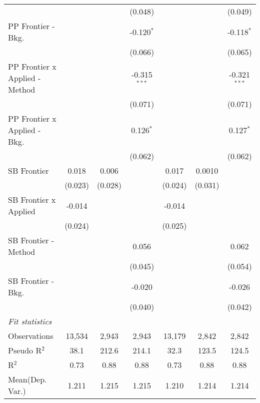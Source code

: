 \begin{tabular}{lcccccc}
                                  &                &                & (0.048)        &                &                & (0.049)\\   
   PP Frontier - Bkg.             &                &                & -0.120$^{*}$   &                &                & -0.118$^{*}$\\   
                                  &                &                & (0.066)        &                &                & (0.065)\\   
   PP Frontier x Applied - Method &                &                & -0.315$^{***}$ &                &                & -0.321$^{***}$\\   
                                  &                &                & (0.071)        &                &                & (0.071)\\   
   PP Frontier x Applied - Bkg.   &                &                & 0.126$^{*}$    &                &                & 0.127$^{*}$\\   
                                  &                &                & (0.062)        &                &                & (0.062)\\   
   SB Frontier                    & 0.018          & 0.006          &                & 0.017          & 0.0010         &   \\   
                                  & (0.023)        & (0.028)        &                & (0.024)        & (0.031)        &   \\   
   SB Frontier x Applied          & -0.014         &                &                & -0.014         &                &   \\   
                                  & (0.024)        &                &                & (0.025)        &                &   \\   
   SB Frontier - Method           &                &                & 0.056          &                &                & 0.062\\   
                                  &                &                & (0.045)        &                &                & (0.054)\\   
   SB Frontier - Bkg.             &                &                & -0.020         &                &                & -0.026\\   
                                  &                &                & (0.040)        &                &                & (0.042)\\   
   \midrule
   \emph{Fit statistics}\\
   Observations                   & 13,534         & 2,943          & 2,943          & 13,179         & 2,842          & 2,842\\  
   Pseudo R$^2$                   & 38.1           & 212.6          & 214.1          & 32.3           & 123.5          & 124.5\\  
   R$^2$                          & 0.73           & 0.88           & 0.88           & 0.73           & 0.88           & 0.88\\  
Mean(Dep. Var.) & 1.211 & 1.215 & 1.215 & 1.210 & 1.214 & 1.214 \\
   

\end{tabular}
